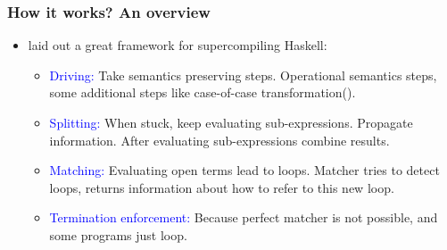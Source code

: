 \documentclass{beamer}
\begin{document}
\begin{frame}
    \frametitle{How it works? An overview}

    \begin{itemize}
        \item[]
            \citet{callbyneed-sc} laid out a great framework for
            supercompiling Haskell:
            \begin{itemize}[<+(1)->]
                \item
                    \textcolor{blue}{Driving:} Take semantics preserving steps.
                    Operational semantics steps, some additional steps like
                    case-of-case
                    transformation(\citet{Jones98atransformation-based}).
                \item
                    \textcolor{blue}{Splitting:} When stuck, keep evaluating
                    sub-expressions. Propagate information. After evaluating
                    sub-expressions combine results.
                \item
                    \textcolor{blue}{Matching:} Evaluating open terms lead to loops.
                    Matcher tries to detect loops, returns information about how
                    to refer to this new loop.
                \item
                    \textcolor{blue}{Termination enforcement:} Because perfect matcher is
                    not possible, and some programs just loop.
            \end{itemize}
    \end{itemize}
\end{frame}

{
    
}
\end{document}
